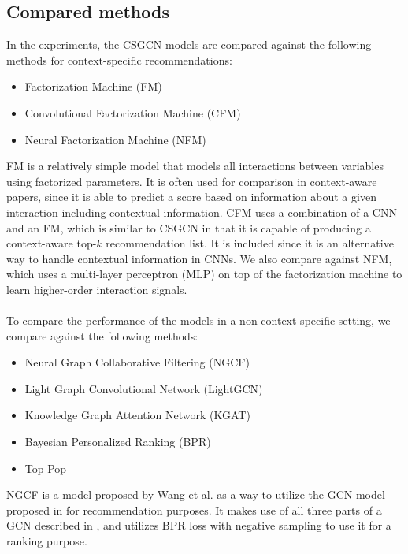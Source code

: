 \subsection{Compared methods}
In the experiments, the CSGCN models are compared against the following methods for context-specific recommendations:
\begin{itemize}
    \item Factorization Machine (FM) \cite{fmrendle}
    \item Convolutional Factorization Machine (CFM) \cite{CFM}
    \item Neural Factorization Machine (NFM) \cite{NeuralFM}
\end{itemize}
FM is a relatively simple model that models all interactions between variables using factorized parameters.
It is often used for comparison in context-aware papers, since it is able to predict a score based on information about a given interaction including contextual information.
CFM uses a combination of a CNN and an FM, which is similar to CSGCN in that it is capable of producing a context-aware top-$k$ recommendation list.
It is included since it is an alternative way to handle contextual information in CNNs.
We also compare against NFM, which uses a multi-layer perceptron (MLP) on top of the factorization machine to learn higher-order interaction signals.
\\\\
To compare the performance of the models in a non-context specific setting, we compare against the following methods:
\begin{itemize}
    \item Neural Graph Collaborative Filtering (NGCF) \cite{NGCF}
    \item Light Graph Convolutional Network (LightGCN) \cite{LightGCN}
    \item Knowledge Graph Attention Network (KGAT) \cite{KGAT}
    \item Bayesian Personalized Ranking (BPR) \cite{BPR}
    \item Top Pop
\end{itemize}
NGCF is a model proposed by Wang et al. as a way to utilize the GCN model proposed in \cite{KOrderConnectivity} for recommendation purposes.
It makes use of all three parts of a GCN described in , and utilizes BPR loss with negative sampling to use it for a ranking purpose.
